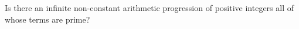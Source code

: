 Is there an infinite non-constant arithmetic progression of positive integers all of whose terms are prime?
